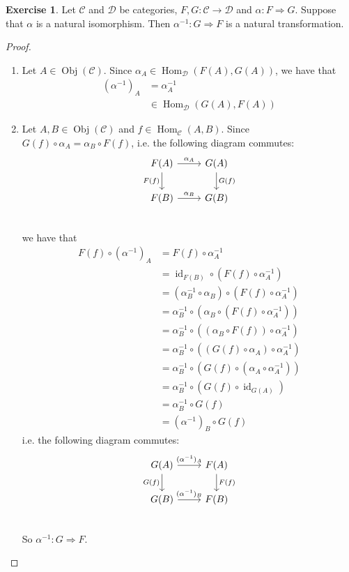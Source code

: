 \documentclass[12pt]{amsart}
\theoremstyle{definition}
\newtheorem{ex}[definition]{Exercise}
\newcommand{\al}{\alpha}
\newcommand{\MC}{\mathcal{C}}
\newcommand{\MD}{\mathcal{D}}
\DeclareMathOperator{\id}{id}
\DeclareMathOperator{\Obj}{Obj}
\DeclareMathOperator{\Hom}{Hom}
\DeclareMathOperator*{\0}{\mbf{0}}
\DeclareMathOperator*{\1}{\mbf{1}}
\newcommand{\lex}[1]{\label{ex:#1}}
\begin{document}
	\begin{ex} \lex{15011.3}
		Let $\MC$ and $\MD$ be categories, $F,G: \MC \rightarrow \MD$ and $\al : F \Rightarrow G$. Suppose that $\al$ is a natural isomorphism. Then $\al^{-1}: G \Rightarrow F$ is a natural transformation. 
	\end{ex}
	
	\begin{proof}\
		\begin{enumerate}
			\item Let $A \in \Obj(\MC)$. Since $\al_A \in \Hom_{\MD}(F(A), G(A))$, we have that 
			\begin{align*}
				(\al^{-1})_A
				& = \al_A^{-1} \\
				& \in \Hom_{\MD}(G(A), F(A))
			\end{align*}
			\item Let $A, B \in \Obj(\MC)$ and $f \in \Hom_{\MC}(A,B)$. Since $G(f) \circ \al_A = \al_B \circ F(f)$, i.e. the following diagram commutes:
			\[ 
			\begin{tikzcd}
				F(A)  \arrow[r, "\al_A"]  \arrow[d, "F(f)"']  & G(A)   \arrow[d, "G(f)"]\\
				F(B) \arrow[r, "\al_B"] &  G(B) \\
			\end{tikzcd}
			\]
			we have that 
			\begin{align*}
				F(f) \circ (\al^{-1})_A 
				& = F(f) \circ \al_A^{-1} \\
				& = \id_{F(B)} \circ (F(f) \circ \al_A^{-1}) \\
				& = (\al_B^{-1} \circ \al_B) \circ (F(f) \circ \al_A^{-1}) \\
				& = \al_B^{-1} \circ (\al_B \circ (F(f) \circ \al_A^{-1})) \\
				& = \al_B^{-1} \circ ((\al_B \circ F(f)) \circ \al_A^{-1}) \\
				& = \al_B^{-1} \circ ((G(f) \circ \al_A) \circ \al_A^{-1}) \\
				& = \al_B^{-1} \circ (G(f) \circ (\al_A \circ \al_A^{-1})) \\
				& = \al_B^{-1} \circ (G(f) \circ \id_{G(A)}) \\
				& = \al_B^{-1} \circ G(f) \\
				& = (\al^{-1})_B \circ G(f) 
 			\end{align*}
 			i.e. the following diagram commutes:
 			\[ 
 			\begin{tikzcd}
 				G(A)  \arrow[r, "(\al^{-1})_A"]  \arrow[d, "G(f)"']  & F(A)   \arrow[d, "F(f)"]\\
 				G(B) \arrow[r, "(\al^{-1})_B"] &  F(B) \\
 			\end{tikzcd}
 			\]
 			So $\al^{-1}: G \Rightarrow F$.
		\end{enumerate}
	\end{proof}
\end{document}
